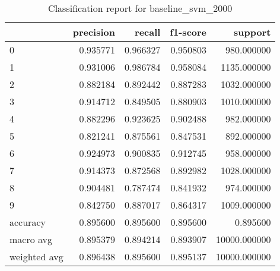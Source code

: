 \begin{table}[htb!]
\centering
\caption{Classification report for baseline_svm_2000}
\label{tab:classification-report-baseline_svm_2000}
\begin{tabular}{lrrrr}
\toprule
 & precision & recall & f1-score & support \\
\midrule
0 & 0.935771 & 0.966327 & 0.950803 & 980.000000 \\
1 & 0.931006 & 0.986784 & 0.958084 & 1135.000000 \\
2 & 0.882184 & 0.892442 & 0.887283 & 1032.000000 \\
3 & 0.914712 & 0.849505 & 0.880903 & 1010.000000 \\
4 & 0.882296 & 0.923625 & 0.902488 & 982.000000 \\
5 & 0.821241 & 0.875561 & 0.847531 & 892.000000 \\
6 & 0.924973 & 0.900835 & 0.912745 & 958.000000 \\
7 & 0.914373 & 0.872568 & 0.892982 & 1028.000000 \\
8 & 0.904481 & 0.787474 & 0.841932 & 974.000000 \\
9 & 0.842750 & 0.887017 & 0.864317 & 1009.000000 \\
accuracy & 0.895600 & 0.895600 & 0.895600 & 0.895600 \\
macro avg & 0.895379 & 0.894214 & 0.893907 & 10000.000000 \\
weighted avg & 0.896438 & 0.895600 & 0.895137 & 10000.000000 \\
\bottomrule
\end{tabular}
\end{table}
